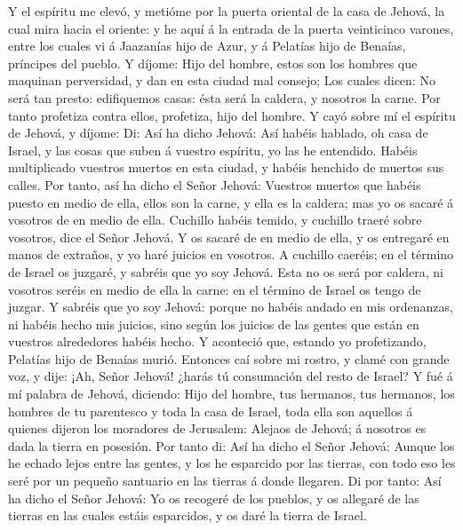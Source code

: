  Y el espíritu me elevó, y metióme por la puerta oriental de
la casa de Jehová, la cual mira hacia el oriente: y he aquí á la entrada
de la puerta veinticinco varones, entre los cuales vi á Jaazanías hijo
de Azur, y á Pelatías hijo de Benaías, príncipes del pueblo.
 Y díjome: Hijo del hombre, estos son los hombres que
maquinan perversidad, y dan en esta ciudad mal consejo;  Los
cuales dicen: No será tan presto: edifiquemos casas: ésta será la
caldera, y nosotros la carne.  Por tanto profetiza contra
ellos, profetiza, hijo del hombre.  Y cayó sobre mí el
espíritu de Jehová, y díjome: Di: Así ha dicho Jehová: Así habéis
hablado, oh casa de Israel, y las cosas que suben á vuestro espíritu, yo
las he entendido.  Habéis multiplicado vuestros muertos en
esta ciudad, y habéis henchido de muertos sus calles.  Por
tanto, así ha dicho el Señor Jehová: Vuestros muertos que habéis puesto
en medio de ella, ellos son la carne, y ella es la caldera; mas yo os
sacaré á vosotros de en medio de ella.  Cuchillo habéis
temido, y cuchillo traeré sobre vosotros, dice el Señor Jehová.
 Y os sacaré de en medio de ella, y os entregaré en manos de
extraños, y yo haré juicios en vosotros.  A cuchillo
caeréis; en el término de Israel os juzgaré, y sabréis que yo soy
Jehová.  Esta no os será por caldera, ni vosotros seréis en
medio de ella la carne: en el término de Israel os tengo de juzgar.
 Y sabréis que yo soy Jehová: porque no habéis andado en
mis ordenanzas, ni habéis hecho mis juicios, sino según los juicios de
las gentes que están en vuestros alrededores habéis hecho. 
Y aconteció que, estando yo profetizando, Pelatías hijo de Benaías
murió. Entonces caí sobre mi rostro, y clamé con grande voz, y dije:
¡Ah, Señor Jehová! ¿harás tú consumación del resto de Israel?
 Y fué á mí palabra de Jehová, diciendo:  Hijo
del hombre, tus hermanos, tus hermanos, los hombres de tu parentesco y
toda la casa de Israel, toda ella son aquellos á quienes dijeron los
moradores de Jerusalem: Alejaos de Jehová; á nosotros es dada la tierra
en posesión.  Por tanto di: Así ha dicho el Señor Jehová:
Aunque los he echado lejos entre las gentes, y los he esparcido por las
tierras, con todo eso les seré por un pequeño santuario en las tierras á
donde llegaren.  Di por tanto: Así ha dicho el Señor
Jehová: Yo os recogeré de los pueblos, y os allegaré de las tierras en
las cuales estáis esparcidos, y os daré la tierra de Israel.
